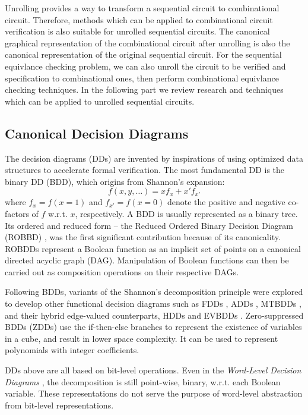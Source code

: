 
Unrolling provides a way to transform a sequential circuit to combinational 
circuit. Therefore,  methods which can be applied to combinational circuit 
verification is also suitable for unrolled sequential circuits. The canonical 
graphical representation of the combinational circuit after unrolling is also 
the canonical representation of the original sequential circuit. For the sequential 
equivlance checking problem, we can also unroll the circuit to be verified and 
specification to combinational ones, then perform combinational equivlance checking
techniques. In the following part we review research and techniques which 
can be applied to unrolled sequential circuits.

\subsection{Canonical Decision Diagrams}
The decision diagrams (DDs) are invented by inspirations of 
using optimized data structures to accelerate formal verification.
The most fundamental DD is the binary DD (BDD), which origins from 
Shannon's expansion:
\begin{equation}
f(x, y, \dots) = x f_x + x' f_{x'}
\end{equation}
where $f_x = f(x = 1)$ and $f_{x'} = f(x = 0)$ denote the positive and
negative co-factors of $f$ w.r.t. $x$, respectively.
A BDD is usually represented as a binary tree.
Its ordered and reduced form -- the Reduced Ordered Binary Decision Diagram (ROBBD)
\cite{BRYA86}, was the first significant contribution because of its canonicality.  
 ROBDDs represent a Boolean function as an
implicit set of points on a canonical directed acyclic graph
(DAG). Manipulation of Boolean functions can then be carried out as
composition operations on their respective DAGs. 

Following BDDs,  variants of the Shannon's decomposition principle
were explored to develop other functional decision diagrams such as
 FDDs \cite{okfdd}, ADDs \cite{add}, MTBDDs \cite{mtbdd}, and their hybrid 
edge-valued counterparts, HDDs \cite{hdd} and EVBDDs \cite{evbdd}. 
Zero-suppressed BDDs (ZDDs) \cite{minato1993zero,minato1994calculation} use the if-then-else branches
to represent the existence of variables in a cube, and result in lower 
space complexity. It can be used to represent polynomials with integer coefficients.


DDs above are all based on bit-level operations. Even in the {\it Word-Level Decision Diagrams}
\cite{WLS}, the decomposition is still point-wise, binary, 
w.r.t. each Boolean variable. These representations do not
serve the purpose of word-level abstraction from bit-level
representations. 

